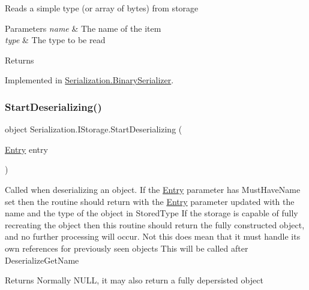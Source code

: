 Reads a simple type (or array of bytes) from storage 


\begin{DoxyParams}{Parameters}
{\em name} & The name of the item\\
\hline
{\em type} & The type to be read\\
\hline
\end{DoxyParams}
\begin{DoxyReturn}{Returns}

\end{DoxyReturn}


Implemented in \hyperlink{class_serialization_1_1_binary_serializer_a1813abad4bdfe9607f093e4df66a4414}{Serialization.\+Binary\+Serializer}.

\mbox{\label{interface_serialization_1_1_i_storage_a90aa19f79a51acf057f20da842ef09b3}} 
\subsubsection{\texorpdfstring{Start\+Deserializing()}{StartDeserializing()}}
{\footnotesize\ttfamily object Serialization.\+I\+Storage.\+Start\+Deserializing (\begin{DoxyParamCaption}\item[{\hyperlink{class_serialization_1_1_entry}{Entry}}]{entry }\end{DoxyParamCaption})}



Called when deserializing an object. If the \hyperlink{class_serialization_1_1_entry}{Entry} parameter has Must\+Have\+Name set then the routine should return with the \hyperlink{class_serialization_1_1_entry}{Entry} parameter updated with the name and the type of the object in Stored\+Type If the storage is capable of fully recreating the object then this routine should return the fully constructed object, and no further processing will occur. Not this does mean that it must handle its own references for previously seen objects This will be called after Deserialize\+Get\+Name 

\begin{DoxyReturn}{Returns}
Normally N\+U\+LL, it may also return a fully depersisted object
\end{DoxyReturn}

